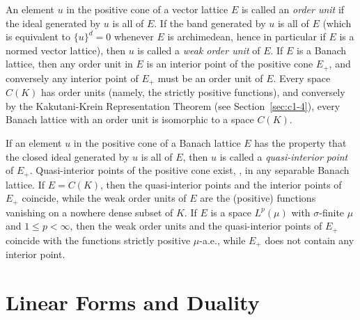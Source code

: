 An element $ u $ in the positive cone of a vector lattice $ E $ is called an \emph{order unit} if the ideal generated by $ u $ is all of $ E $.
If the band generated by $ u $ is all of $ E $ (which is equivalent to $ \{u\}^{d} = 0 $ whenever $ E $ is archimedean, hence in particular if $ E $ is a normed vector lattice), then $ u $ is called a \emph{weak order unit} of $ E $.
If $ E $ is a Banach lattice, then any order unit in $ E $ is an interior point of the positive cone $ E_{+} $, and conversely any interior point of $ E_{+} $ must be an order unit of $ E $.
Every space $ C(K) $ has order units (namely, the strictly positive functions), and conversely by the Kakutani-Krein Representation Theorem (see Section~\ref{sec:c1-4}), every Banach lattice with an order unit is isomorphic to a space $ C(K) $.

If an element $ u $ in the positive cone of a Banach lattice $ E $ has the property that the closed ideal generated by $ u $ is all of $ E $, then $ u $ is called a \emph{quasi-interior point} of $ E_{+} $.
Quasi-interior points of the positive cone exist, \eg, in any separable Banach lattice.
If $ E = C(K) $, then the quasi-interior points and the interior points of $ E_{+} $ coincide, while the weak order units of $ E $ are the (positive) functions vanishing on a nowhere dense subset of $ K $.
If $ E $ is a space $ L^{p}(\mu) $ with $ \sigma $-finite $ \mu $ and $ 1 \leq p < \infty $, then the weak order units and the quasi-interior points of $ E_{+} $ coincide with the functions strictly positive $ \mu $-a.e., while $ E_{+} $ does not contain any interior point.
\section{Linear Forms and Duality}\label{sec:c1-3}


